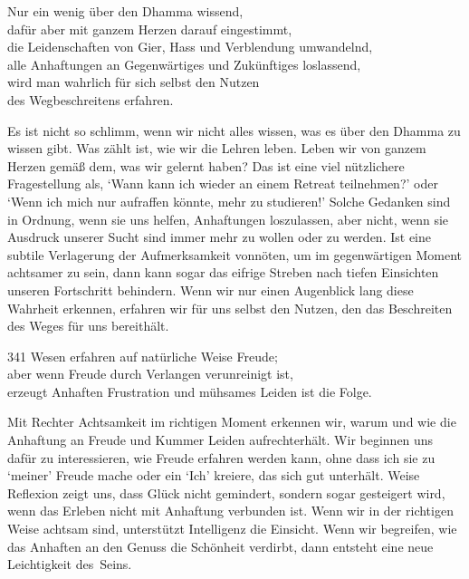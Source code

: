 
\begin{dhpVerse}{20}
\label{dhp-20}
Nur ein wenig über den Dhamma wissend,\\ 
dafür aber mit ganzem Herzen darauf eingestimmt,\\ 
die Leidenschaften von Gier, Hass und Verblendung umwandelnd,\\ 
alle Anhaftungen an Gegenwärtiges und Zukünftiges loslassend,\\ 
wird man wahrlich für sich selbst den Nutzen\\ 
des Wegbeschreitens erfahren. 
\end{dhpVerse}

\begin{dhpRefl}

Es ist nicht so schlimm, wenn wir nicht alles wissen, was es über den Dhamma
zu wissen gibt. Was zählt ist, wie wir die Lehren leben. Leben wir von ganzem
Herzen gemäß dem, was wir gelernt haben? Das ist eine viel nützlichere
Fragestellung als, `Wann kann ich wieder an einem Retreat teilnehmen?’ oder
`Wenn ich mich nur aufraffen könnte, mehr zu studieren!’ Solche Gedanken sind
in Ordnung, wenn sie uns helfen, Anhaftungen loszulassen, aber nicht, wenn sie
Ausdruck unserer Sucht sind immer mehr zu wollen oder zu werden. Ist eine
subtile Verlagerung der Aufmerksamkeit vonnöten, um im gegenwärtigen Moment
achtsamer zu sein, dann kann sogar das eifrige Streben nach tiefen Einsichten
unseren Fortschritt behindern. Wenn wir nur einen Augenblick lang diese
Wahrheit erkennen, erfahren wir für uns selbst den Nutzen, den das
Beschreiten des Weges für uns bereithält.

\end{dhpRefl}


\begin{dhpVerse}{341}
\label{dhp-341}
Wesen erfahren auf natürliche Weise Freude;\\ 
aber wenn Freude durch Verlangen verunreinigt ist,\\ 
erzeugt Anhaften Frustration und mühsames Leiden ist die Folge. 
\end{dhpVerse}

\begin{dhpRefl}

Mit Rechter Achtsamkeit im richtigen Moment erkennen wir, warum und wie die
Anhaftung an Freude und Kummer Leiden aufrechterhält. Wir beginnen uns dafür
zu interessieren, wie Freude erfahren werden kann, ohne dass ich sie zu
`meiner' Freude mache oder ein `Ich' kreiere, das sich gut unterhält. Weise
Reflexion zeigt uns, dass Glück nicht gemindert, sondern sogar gesteigert
wird, wenn das Erleben nicht mit Anhaftung verbunden ist. Wenn wir in der
richtigen Weise achtsam sind, unterstützt Intelligenz die Einsicht. Wenn wir
begreifen, wie das Anhaften an den Genuss die Schönheit verdirbt, dann entsteht eine
neue Leichtigkeit des~Seins.

\end{dhpRefl}

